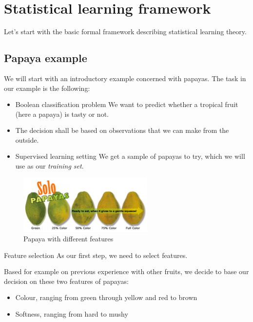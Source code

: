 \section{Statistical learning framework}

Let's start with the basic formal framework describing statistical learning theory. 


\subsection*{Papaya example}
We will start with an introductory example concerned with papayas. The task in our example is the following: 

\begin{itemize}
  \item \begin{tikzborder}{Boolean classification problem} We want to predict whether a tropical fruit (here a papaya) is tasty or not.\end{tikzborder}
  \item The decision shall be based on observations that we can make from the outside.
  \item \begin{tikzborder}{Supervised learning setting} We get a sample of papayas to try, which we will use as our \textit{training set}.
  \end{tikzborder}
\end{itemize}

\begin{figure}[h]
  \centering
  \includegraphics[width=0.6\textwidth]{assets/slf/papayas.jpg} 
  \caption{Papaya with different features}
\end{figure}

\begin{tikzborder}{Feature selection} As our first step, we need to select features.\end{tikzborder} Based for example on previous experience with other fruits, we decide to base our decision on these two features of papayas:
\begin{itemize}
  \item Colour, ranging from green through yellow and red to brown
  \item Softness, ranging from hard to mushy
\end{itemize}

